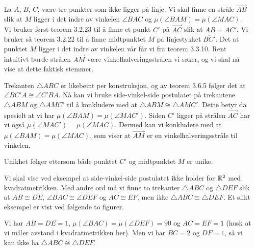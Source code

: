 
\begin{oppgave}[3.6.1]
    La $A$, $B$, $C$, være tre punkter som ikke ligger på linje. Vi skal finne en stråle $\overrightarrow{AB}$ slik at $M$ ligger i det indre av vinkelen $\angle BAC$ og $\mu(\angle BAM)=\mu(\angle MAC)$.
    Vi bruker først teorem 3.2.23 til å finne et punkt $C'$ på $\overrightarrow{AC}$ slik at $AB=AC'$. 
    Vi bruker så teorem 3.2.22 til å finne midtpunktet $M$ på linjestykket $\overline{BC'}$.
    Det at punktet $M$ ligger i det indre av vinkelen vår får vi fra teorem 3.3.10. 
    Rent intuitivt burde strålen $\overrightarrow{AM}$ være vinkelhalveringsstrålen vi søker, og vi skal nå vise at dette faktisk stemmer. 

    Trekanten $\triangle ABC$ er likebeint per konstruksjon, og av teorem 3.6.5 følger det at $\angle BC'A \cong \angle C'BA$. 
    Nå kan vi bruke side-vinkel-side postulatet på trekantene $\triangle ABM$ og $\triangle AMC'$ til å konkludere med at $\triangle ABM \cong \triangle AMC'$. 
    Dette betyr da spesielt at vi har $\mu(\angle BAM) = \mu(\angle MAC')$.
    Siden $C'$ ligger på strålen $\overrightarrow{AC}$ har vi også $\mu(\angle MAC') = \mu(\angle MAC)$.
    Dermed kan vi konkludere med at $\mu(\angle BAM) = \mu(\angle MAC)$, som viser at $\overrightarrow{AM}$ er en vinkelhalveringsstråle til vinkelen. 

    Unikhet følger ettersom både punktet $C'$ og midtpunktet $M$ er unike. 

    \begin{figure}[H]
        \centering
        
    \end{figure}
\end{oppgave}

\begin{oppgave}[3.6.2]
    Vi skal vise ved eksempel at side-vinkel-side postulatet ikke holder for $\mathbb{R}^2$ med kvadratmetrikken.
    Med andre ord må vi finne to trekanter $\triangle ABC$ og $\triangle DEF$ slik at $\overline{AB}\cong \overline{DE}$, $\angle BAC \cong \angle DEF$ og $\overline{AC}\cong \overline{EF}$, men ikke $\triangle ABC\cong\triangle DEF$.
    Et slikt eksempel er vist ved følgende to figurer.
    
    \begin{figure}[H]
        \centering
        
    \end{figure}

    \begin{figure}[H]
        \centering
        
    \end{figure}
    
    Vi har $AB=DE=1$, $\mu(\angle BAC) = \mu(\angle DEF) = 90$ og $AC=EF=1$ (husk at vi måler avstand i kvadratmetrikken her). 
    Men vi har $BC=2$ og $DF=1$, så vi kan ikke ha $\triangle ABC\cong \triangle DEF$. 
\end{oppgave}

